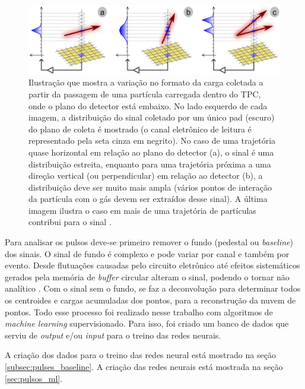 \documentclass[a4paper,12pt,oneside]{book}
\begin{document}
\begin{figure}[H]
    \centering
    \includegraphics[scale = 0.29]{figs/get.png}
    \caption{Ilustração que mostra a variação no formato da carga coletada a partir da passagem de uma partícula carregada dentro do TPC, onde o plano do detector está embaixo. No lado esquerdo de cada imagem, a distribuição do sinal coletado por um único pad (escuro) do plano de coleta é mostrado (o canal eletrônico de leitura é representado pela seta cinza em negrito). No caso de uma trajetória quase horizontal em relação ao plano do detector (a), o sinal é uma distribuição estreita, enquanto para uma trajetória próxima a uma direção vertical (ou perpendicular) em relação ao detector (b), a distribuição deve ser muito mais ampla (vários pontos de interação da partícula com o gás devem ser extraídos desse sinal). A última imagem ilustra o caso em mais de uma trajetória de partículas contribui para o sinal \cite{GET}.}
    \label{fig:get_signal}
\end{figure}

\par Para analisar os pulsos deve-se primeiro remover o fundo (pedestal ou \textit{baseline}) dos sinais. O sinal de fundo é complexo e pode variar por canal e também por evento. Desde flutuações causadas pelo circuito eletrônico até efeitos sistemáticos gerados pela memória de \textit{buffer} circular alteram o sinal, podendo o tornar não analítico \cite{FORTINO2022166497, GET}. Com o sinal sem o fundo, se faz a deconvolução para determinar todos os centroides e cargas acumuladas dos pontos, para a reconstrução da nuvem de pontos. Todo esse processo foi realizado nesse trabalho com algoritmos de \textit{machine learning} supervisionado\cite{FORTINO2022166497}. Para isso, foi criado um banco de dados que serviu de \textit{output} e/ou \textit{input} para o treino das redes neurais.

\par A criação dos dados para o treino das redes neural está mostrado na seção \ref{subsec:pulses_baseline}. A criação das redes neurais está mostrada na seção \ref{sec:pulsos_ml}. 
\end{document}
